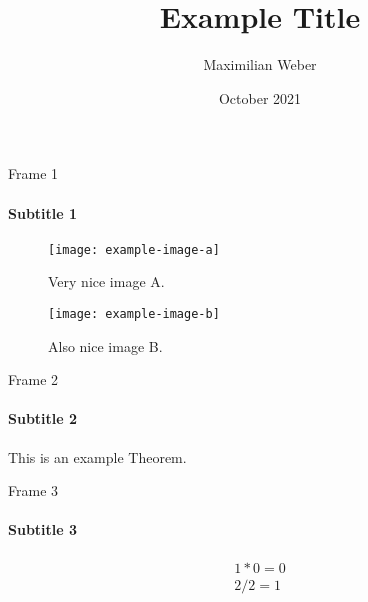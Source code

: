 \documentclass[10pt]{beamer}
\title{Example Title}
\author{Maximilian Weber}
\institute{supported by UZH}
\date{October 2021}
\begin{document}
\frame{\titlepage}
\begin{frame}{Frame 1}
    \framesubtitle{Subtitle 1}
    \begin{figure}
    \centering
        \begin{minipage}{.45\textwidth}
          \centering
          \texttt{[image: example-image-a]}
          \caption{Very nice image A.}
          \label{fig:test-a}
        \end{minipage}%
        \begin{minipage}{.45\textwidth}
          \centering
          \texttt{[image: example-image-b]}
          \caption{Also nice image B.}
          \label{fig:test-b}
        \end{minipage}
    \end{figure}
\end{frame}
\begin{frame}{Frame 2}
    \framesubtitle{Subtitle 2}
    \begin{theorem}
        This is an example Theorem.
    \end{theorem}
\end{frame}
\begin{frame}{Frame 3}
    \framesubtitle{Subtitle 3}
        \begin{gather}
            1*0=0 \\
            2/2=1
        \end{gather}
\end{frame}
\end{document}
